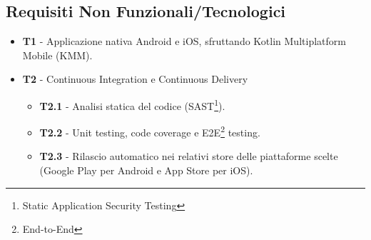 \subsection{Requisiti Non Funzionali/Tecnologici}
\begin{itemize}
    \item \textbf{T1} - Applicazione nativa Android e iOS, sfruttando Kotlin Multiplatform Mobile (KMM).
    \item \textbf{T2} - Continuous Integration e Continuous Delivery
    \begin{itemize}
        \item \textbf{T2.1} - Analisi statica del codice (SAST\footnote{Static Application Security Testing}).
        \item \textbf{T2.2} - Unit testing, code coverage e E2E\footnote{End-to-End} testing.
        \item \textbf{T2.3} - Rilascio automatico nei relativi store delle piattaforme scelte (Google Play per Android e App Store per iOS).
    \end{itemize}
\end{itemize}


